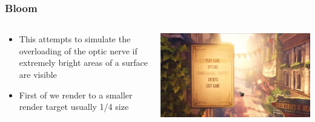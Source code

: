 \begin{frame}
	\frametitle{Bloom}
	\begin{columns}
		\begin{column}{0.5\textwidth}
			\begin{itemize}
				\item This attempts to simulate the overloading of the optic nerve if extremely bright areas of a surface are visible
				\item First of we render to a smaller render target usually 1/4 size
			\end{itemize}
		\end{column}
		\begin{column}{0.5\textwidth} 
			\begin{center}
				\includegraphics[width=\textwidth]{bloom}
			\end{center}
		\end{column}
	\end{columns}	
\end{frame}

